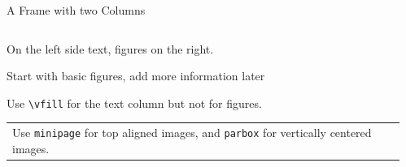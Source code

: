 
\begin{frame}{A Frame with two Columns}
  \begin{columns}
    \begin{column}{.45\textwidth}
      \minipage[c][0.65\textheight][s]{\columnwidth}
      \vspace{0.05\textheight}
      
      On the left side text, figures on the right.

      \vfill


      Start with basic figures, add more information later

      \vfill


      Use \texttt{\textbackslash vfill} for the text column but not
      for figures.

      \vfill
      \begin{tabular}{|p{}}
        Use \texttt{minipage} for top aligned images, and
        \texttt{parbox} for vertically centered images.
      \end{tabular}
      
      
      \endminipage      
    \end{column}
    \begin{column}{.55\textwidth}


      
    \end{column}
  \end{columns}

\end{frame}
